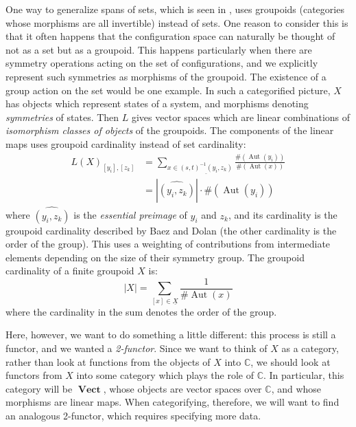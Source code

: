 \documentclass[10pt]{amsart}
\numberwithin{theorem}{subsection}
\newcommand{\opname}[1]{\operatorname{#1}}
\newcommand{\catname}[1]{\boldsymbol{\opname{{#1}}}}
\newcommand{\V}{\catname{Vect}}
\begin{document}
One way to generalize spans of sets, which is seen in \cite{hdaVII},
uses groupoids (categories whose morphisms are all invertible) instead
of sets.  One reason to consider this is that it often happens that
the configuration space can naturally be thought of not as a set but
as a groupoid.  This happens particularly when there are symmetry
operations acting on the set of configurations, and we explicitly
represent such symmetries as morphisms of the groupoid.  The existence
of a group action on the set would be one example.  In such a
categorified picture, $X$ has objects which represent states of a
system, and morphisms denoting \textit{symmetries} of states.  Then
$L$ gives vector spaces which are linear combinations of
\textit{isomorphism classes of objects} of the groupoids.  The
components of the linear maps uses groupoid cardinality instead of set
cardinality:
\begin{align}
\label{eq:baezgpdify} L(X)_{[y_i],[z_k]} & = \sum_{x \in \underline{(s,t)^{-1}(y_i,z_k)}}\frac{\#(\opname{Aut}(y_i))}{\#(\opname{Aut}(x))} \\ 
\nonumber & = |\widehat{(y_i,z_k)}| \cdot \# (\opname{Aut}(y_i))
\end{align}
where $\widehat{(y_i,z_k)}$ is the \textit{essential preimage} of
$y_i$ and $z_k$, and its cardinality is the groupoid cardinality
described by Baez and Dolan \cite{finfeyn} (the other cardinality is
the order of the group).  This uses a weighting of contributions from
intermediate elements depending on the size of their symmetry group.
The groupoid cardinality of a finite groupoid $X$ is:
\begin{equation}\label{eq:gpdcard}
|X| = \sum_{[x] \in \underline{X}} \frac{1}{\# \opname{Aut}(x)}
\end{equation}
where the cardinality in the sum denotes the order of the group.

Here, however, we want to do something a little different: this
process is still a functor, and we wanted a \textit{2-functor}.  Since
we want to think of $X$ as a category, rather than look at functions
from the objects of $X$ into $\mathbb{C}$, we should look at functors
from $X$ into some category which plays the role of $\mathbb{C}$.  In
particular, this category will be $\V$, whose objects are vector
spaces over $\mathbb{C}$, and whose morphisms are linear maps.  When
categorifying, therefore, we will want to find an analogous 2-functor,
which requires specifying more data.
\end{document}
